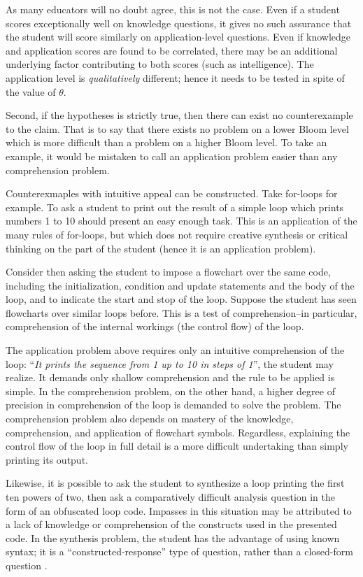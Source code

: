 As many educators will no doubt agree, this is not the case. Even if a student
scores exceptionally well on knowledge questions, it gives no such assurance
that the student will score similarly on application-level questions.  Even if
knowledge and application scores are found to be correlated, there may be an
additional underlying factor contributing to both scores (such as
intelligence).  The application level is \emph{qualitatively} different; hence
it needs to be tested in spite of the value of $\theta$.

Second, if the hypotheses is strictly true, then there can exist no
counterexample to the claim.  That is to say that there exists no problem on a
lower Bloom level which is more difficult than a problem on a higher Bloom
level.  To take an example, it would be mistaken to call an application problem
easier than any comprehension problem. 

Counterexmaples with intuitive appeal can be constructed.  Take for-loops for
example.  To ask a student to print out the result of a simple loop which
prints numbers 1 to 10 should present an easy enough task.  This is an
application of the many rules of for-loops, but which does not require creative
synthesis or critical thinking on the part of the student (hence it is an
application problem). 

Consider then asking the student to impose a flowchart over the same code,
including the initialization, condition and update statements and the body of
the loop, and to indicate the start and stop of the loop.  Suppose the student
has seen flowcharts over similar loops before.  This is a test of
comprehension--in particular, comprehension of the internal workings (the
control flow) of the loop.    

The application problem above requires only an intuitive comprehension of the
loop: ``\emph{It prints the sequence from 1 up to 10 in steps of 1}'', the
student may realize.  It demands only shallow comprehension and the rule to be
applied is simple.  In the comprehension problem, on the other hand, a higher
degree of precision in comprehension of the loop is demanded to solve the
problem.  The comprehension problem also depends on mastery of the knowledge,
comprehension, and application of flowchart symbols.  Regardless, explaining
the control flow of the loop in full detail is a more difficult undertaking
than simply printing its output. 

Likewise, it is possible to ask the student to synthesize a loop printing the
first ten powers of two, then ask a comparatively difficult analysis question
in the form of an obfuscated loop code.  Impasses in this situation may be
attributed to a lack of knowledge or comprehension of the constructs used in
the presented code.  In the synthesis problem, the student has the advantage of
using known syntax; it is a ``constructed-response'' type of question, rather
than a closed-form question \cite{kuechler2010performance}. 

